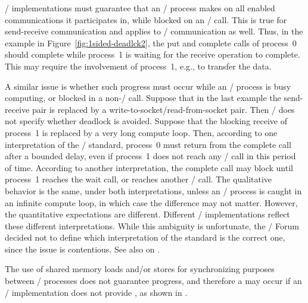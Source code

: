 \begin{rationale}
\MPI/ implementations must guarantee that an \mpi/ process makes 
on all enabled communications it participates in,
while blocked on an \MPI/ call.  This is
true for send-receive communication and applies to \RMA/ communication
as well.  Thus, in the example in Figure~\ref{fig:1sided-deadlck2},
the put and complete calls of process~0 should complete
while process~1 is waiting for the receive operation to complete.  This may require the
involvement of process~1, e.g., to transfer the data.

A similar issue is whether such progress must occur
while an \mpi/ process is busy computing, or blocked in a
non-\MPI/ call.  Suppose that in the last example the send-receive
pair is replaced by a write-to-socket/read-from-socket pair.  Then
\MPI/ does not specify whether deadlock is avoided.
Suppose that the blocking
receive of process~1 is replaced by a very long compute loop.  Then,
according to one interpretation of
the \MPI/ standard, process~0 must return from the complete call after
a bounded delay, even if process~1 does not reach any \MPI/ call in
this period of time.  According to another interpretation, the
complete call may block until process~1 reaches the wait call, or
reaches another \MPI/ call.  The qualitative behavior is the same,
under both interpretations, unless an \mpi/ process is caught in an infinite compute loop, in which case the difference may not matter.
However, the quantitative expectations are different.
Different \MPI/ implementations reflect these different
interpretations.
While this ambiguity is unfortunate, the \MPI/ Forum decided not to define
which interpretation of the standard is the correct one, since the issue is
contentious.
See also  on
.
\end{rationale}

The use of shared memory loads
and/or stores for synchronizing
purposes between \MPI/ processes does not guarantee progress, and therefore
a  may occur if an \MPI/ implementation
does not provide , as shown in .

